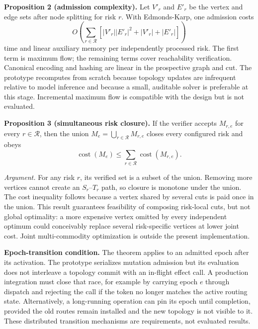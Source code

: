 \documentclass[10pt,journal,compsoc]{IEEEtran}
\begin{document}
\textbf{Proposition 2 (admission complexity).}
Let $V'_r$ and $E'_r$ be the vertex and edge sets after node splitting for risk
$r$.  With Edmonds-Karp, one admission costs
\begin{equation}
O\!\left(\sum_{r\in\mathcal R}\left[|V'_r||E'_r|^2
+|V'_r|+|E'_r|\right]\right)
\label{eq:complexity}
\end{equation}
time and linear auxiliary memory per independently processed risk.  The first
term is maximum flow; the remaining terms cover reachability verification.
Canonical encoding and hashing are linear in the prospective graph and cut.
The prototype recomputes from scratch because topology updates are infrequent
relative to model inference and because a small, auditable solver is preferable
at this stage.  Incremental maximum flow is compatible with the design but is
not evaluated.

\textbf{Proposition 3 (simultaneous risk closure).}
If the verifier accepts $M_{r,e}$ for every $r\in\mathcal R$, then the union
$M_e=\bigcup_{r\in\mathcal R}M_{r,e}$ closes every configured risk and obeys
\begin{equation}
\operatorname{cost}(M_e)\leq
\sum_{r\in\mathcal R}\operatorname{cost}(M_{r,e}).
\label{eq:unionbound}
\end{equation}

\emph{Argument.}
For any risk $r$, its verified set is a subset of the union.  Removing more
vertices cannot create an $S_r$--$T_r$ path, so closure is monotone under the
union.  The cost inequality follows because a vertex shared by several cuts is
paid once in the union.  This result guarantees feasibility of composing
risk-local cuts, but not global optimality: a more expensive vertex omitted by
every independent optimum could conceivably replace several risk-specific
vertices at lower joint cost.  Joint multi-commodity optimization is outside
the present implementation.

\textbf{Epoch-transition condition.}
The theorem applies to an admitted epoch after its activation.  The prototype
serializes mutation admission but its evaluation does not interleave a topology
commit with an in-flight effect call.  A production integration must close that
race, for example by carrying epoch $e$ through dispatch and rejecting the call
if the token no longer matches the active routing state.  Alternatively, a
long-running operation can pin its epoch until completion, provided the old
routes remain installed and the new topology is not visible to it.  These
distributed transition mechanisms are requirements, not evaluated results.
\end{document}
